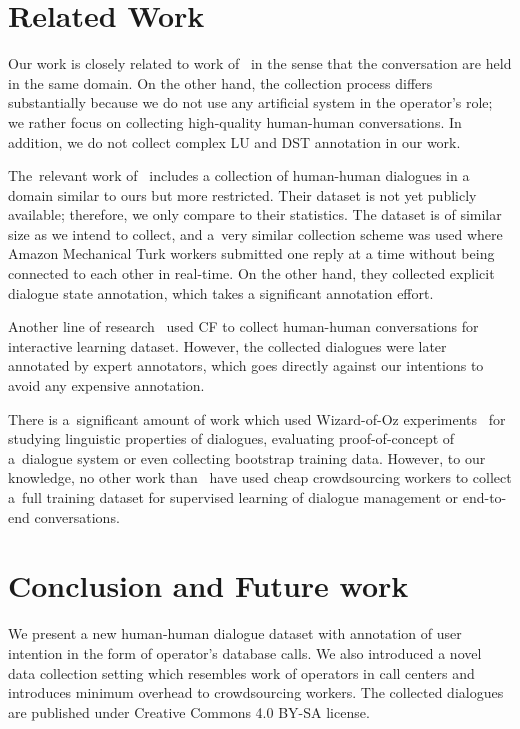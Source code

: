\documentclass[runningheads,a4paper]{llncs}
\begin{document}
\section{Related Work} \label{sec:related}
\vspace{-0.50em}
Our work is closely related  to work of~\cite{williams2013dstc1,henderson2014dstc2,henderson2014dstc3} in the sense that the conversation are held in the same domain.
On the other hand, the collection process differs substantially because we do not use any artificial system in the operator's role;
we rather focus on collecting high-quality human-human conversations. 
In addition, we do not collect complex LU and DST annotation in our work.

The~relevant work of~\cite{wen2016network} includes a collection of human-human dialogues in a domain similar to ours but more restricted.
Their dataset is not yet publicly available; therefore, we only compare to their statistics.
The dataset is of similar size as we intend to collect, and a~very similar collection scheme was used where Amazon Mechanical Turk workers submitted one reply at a time without being connected to each other in real-time.
On the other hand, they collected explicit dialogue state annotation, which takes a significant annotation effort.

Another line of research~\cite{vodolan2016data} used CF to collect human-human conversations for interactive learning dataset.
However, the collected dialogues were later annotated by expert annotators, which goes directly against our intentions to avoid any expensive annotation.

There is a~significant amount of work which used Wizard-of-Oz experiments~\cite{whittaker2002fish,walker1997evaluating,rieser2008learning} for studying linguistic properties of dialogues, evaluating proof-of-concept of a~dialogue system or even collecting bootstrap training data.
However, to our knowledge, no other work than~\cite{wen2016network} have used cheap crowdsourcing workers to collect a~full training dataset for supervised learning of dialogue management or end-to-end conversations.

\section{Conclusion and Future work} \label{sec:conc}
\vspace{-0.50em}
We present a new human-human dialogue dataset with annotation of user intention in the form of operator's database calls.
We also introduced a novel data collection setting which resembles work of operators in call centers and introduces minimum overhead to crowdsourcing workers.
The collected dialogues are published under Creative Commons 4.0 BY-SA license.
\end{document}
